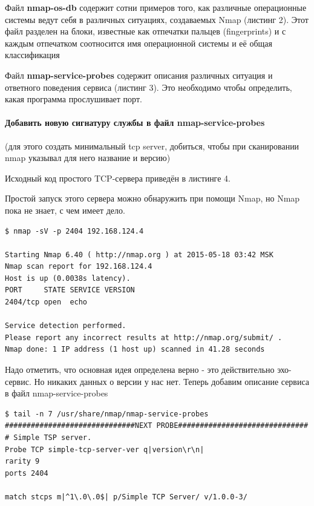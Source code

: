 \documentclass[a4paper, 12pt]{article}		%
\begin{document}


Файл \textbf{nmap-os-db} содержит сотни примеров того, как различные операционные системы ведут себя в различных ситуациях, создаваемых Nmap (листинг 2). Этот файл разделен на блоки, известные как отпечатки пальцев (fingerprints) и с каждым отпечатком соотносится имя операционной системы и её общая классификация



Файл \textbf{nmap-service-probes} содержит описания различных ситуация и ответного поведения сервиса (листинг 3). Это необходимо чтобы определить, какая программа прослушивает порт.



\paragraph{Добавить новую сигнатуру службы в файл nmap-service-probes} (для этого создать минимальный tcp server, добиться, чтобы при сканировании nmap указывал для него название и версию)

Исходный код простого TCP-сервера приведён в листинге 4.



Простой запуск этого сервера можно обнаружить при помощи Nmap, но Nmap пока не знает, с чем имеет дело.

\begin{Verbatim}[frame=single]
$ nmap -sV -p 2404 192.168.124.4

Starting Nmap 6.40 ( http://nmap.org ) at 2015-05-18 03:42 MSK
Nmap scan report for 192.168.124.4
Host is up (0.0038s latency).
PORT     STATE SERVICE VERSION
2404/tcp open  echo

Service detection performed.
Please report any incorrect results at http://nmap.org/submit/ .
Nmap done: 1 IP address (1 host up) scanned in 41.28 seconds
\end{Verbatim}

Надо отметить, что основная идея определена верно - это действительно эхо-сервис. Но никаких данных о версии у нас нет. Теперь добавим описание сервиса в файл nmap-service-probes
\begin{Verbatim}[frame=single]
$ tail -n 7 /usr/share/nmap/nmap-service-probes
##############################NEXT PROBE##############################
# Simple TSP server.
Probe TCP simple-tcp-server-ver q|version\r\n|
rarity 9
ports 2404

match stcps m|^1\.0\.0$| p/Simple TCP Server/ v/1.0.0-3/
\end{Verbatim}
\end{document}
